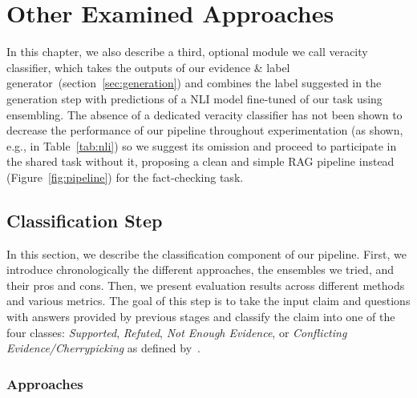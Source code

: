 \section{Other Examined Approaches}
In this chapter, we also describe a third, optional module we call veracity classifier, which takes the outputs of our evidence \& label generator~(section~\ref{sec:generation}) and combines the label suggested in the generation step with predictions of a NLI model fine-tuned of our task using ensembling.
The absence of a dedicated veracity classifier has not been shown to decrease the performance of our pipeline throughout experimentation (as shown, e.g., in Table~\ref{tab:nli}) so we suggest its omission and proceed to participate in the \averitec{}  shared task without it, proposing a clean and simple RAG pipeline instead (Figure~\ref{fig:pipeline}) for the fact-checking task.

\subsection{Classification Step}
In this section, we describe the classification component of our pipeline. First, we introduce chronologically the different approaches, the ensembles we tried, and their pros and cons. Then, we present evaluation results across different methods and various metrics. The goal of this step is to take the input claim and questions with answers provided by previous stages  and classify the claim into one of the four classes: \textit{Supported}, \textit{Refuted}, \textit{Not Enough Evidence}, or \textit{Conflicting Evidence/Cherrypicking} as defined by~\citealp{averitec2024}.

\subsubsection{Approaches}

